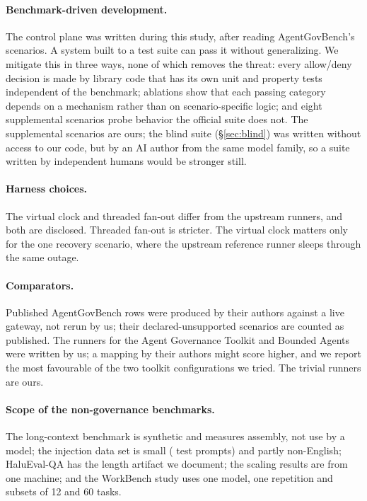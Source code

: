 \paragraph{Benchmark-driven development.} The control plane was written during this study, after reading AgentGovBench's scenarios. A system built to a test suite can pass it without generalizing. We mitigate this in three ways, none of which removes the threat: every allow/deny decision is made by library code that has its own unit and property tests independent of the benchmark; ablations show that each passing category depends on a mechanism rather than on scenario-specific logic; and eight supplemental scenarios probe behavior the official suite does not. The supplemental scenarios are ours; the blind suite (\S\ref{sec:blind}) was written without access to our code, but by an AI author from the same model family, so a suite written by independent humans would be stronger still.
\paragraph{Harness choices.} The virtual clock and threaded fan-out differ from the upstream runners, and both are disclosed. Threaded fan-out is stricter. The virtual clock matters only for the one recovery scenario, where the upstream reference runner sleeps through the same outage.
\paragraph{Comparators.} Published AgentGovBench rows were produced by their authors against a live gateway, not rerun by us; their declared-unsupported scenarios are counted as published. The runners for the Agent Governance Toolkit and Bounded Agents were written by us; a mapping by their authors might score higher, and we report the most favourable of the two toolkit configurations we tried. The trivial runners are ours.
\paragraph{Scope of the non-governance benchmarks.} The long-context benchmark is synthetic and measures assembly, not use by a model; the injection data set is small (\InjTestN{} test prompts) and partly non-English; HaluEval-QA has the length artifact we document; the scaling results are from one machine; and the WorkBench study uses one model, one repetition and subsets of 12 and 60 tasks.

